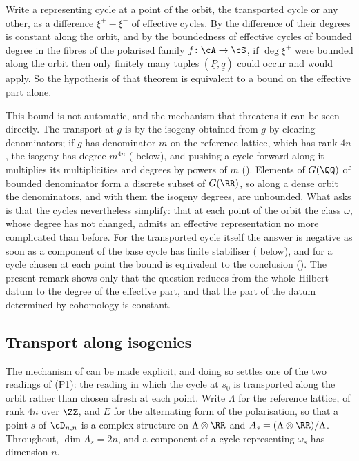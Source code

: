 \begin{remark}
\label{rem:whereunbounded}
Write a representing cycle at a point of the orbit, the transported cycle or
any other, as a difference $\xi^{+}-\xi^{-}$ of effective cycles. By
 the difference of their degrees is constant along
the orbit, and by the boundedness of effective cycles of bounded degree in
the fibres of the polarised family $f\colon\cA\to\cS$, if $\deg\xi^{+}$ were
bounded along the orbit then only finitely many tuples
$(\underline{P},\underline{q})$ could occur and  would
apply. So the hypothesis of that theorem is equivalent to a bound on the
effective part alone.

This bound is not automatic, and the mechanism that threatens it can be seen
directly. The transport at $g$ is by the isogeny obtained from $g$ by
clearing denominators; if $g$ has denominator $m$ on the reference lattice,
which has rank $4n$, the isogeny has degree $m^{4n}$ (
below), and pushing a cycle forward along it multiplies its multiplicities
and degrees by powers of $m$ (). Elements of $G(\QQ)$ of bounded denominator form a discrete subset of
$G(\RR)$, so along a dense orbit the denominators, and with them the isogeny
degrees, are unbounded. What  asks is that the cycles
nevertheless simplify: that at each point of the orbit the class $\omega$,
whose degree has not changed, admits an effective representation no more
complicated than before. For the transported cycle itself the answer is
negative as soon as a component of the base cycle has finite stabiliser
( below), and for a cycle chosen at each point the bound
is equivalent to the conclusion (). The present remark
shows only that the question reduces from the whole Hilbert datum to the
degree of the effective part, and that the part of the datum determined by
cohomology is constant.
\end{remark}

\subsection{Transport along isogenies}

The mechanism of  can be made explicit, and doing
so settles one of the two readings of \textup{(P1)}: the reading in
which the cycle at $s_{0}$ is transported along the orbit rather than chosen
afresh at each point. Write $\Lambda$ for the reference lattice, of rank $4n$
over $\ZZ$, and $E$ for the alternating form of the polarisation, so that a
point $s$ of $\cD_{n,n}$ is a complex structure on $\Lambda\otimes\RR$ and
$A_{s}=(\Lambda\otimes\RR)/\Lambda$. Throughout, $\dim A_{s}=2n$, and a
component of a cycle representing $\omega_{s}$ has dimension $n$.

